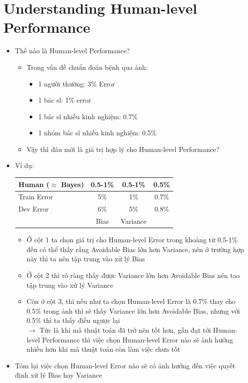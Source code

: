 \documentclass[12pt,a4paper]{report}
\begin{document}
	\section{Understanding Human-level Performance}
		\begin{itemize}
			\item Thế nào là Human-level Performance?
				\begin{itemize}
					\item Trong vấn đề chuẩn đoán bệnh qua ảnh:
						\begin{itemize}
							\item 1 người thường: 3\% Error
							\item 1 bác sĩ: 1\% error
							\item 1 bác sĩ nhiều kinh nghiệm: 0.7\%
							\item 1 nhóm bác sĩ nhiều kinh nghiệm: 0.5\%
						\end{itemize}
					\item Vậy thì đâu mới là giá trị hợp lý cho Human-level Performance?
				\end{itemize}
			\item Ví dụ:\\
				\begin{tabular}{l|c|c|c}
					Human ($\approx$ Bayes)&0.5-1\%&0.5-1\%&0.5\%\\
					\hline
					Train Error&5\%&1\%&0.7\%\\
					Dev Error&6\%&5\%&0.8\%\\
					&Bias&Variance&\\
				\end{tabular}
				\begin{itemize}
					\item Ở cột 1 ta chọn giá trị cho Human-level Error trong khoảng từ 0.5-1\% đều có thể thấy rằng Avoidable Bias lớn hơn Variance, nên ở trường hợp này thì ta nên tập trung vào xử lý Bias
					\item Ở cột 2 thì rõ ràng thấy được Variance lớn hơn Avoidable Bias nên tao tập trung vào xử lý Variance
					\item Còn ở cột 3, thì nếu như ta chọn Human-level Error là 0.7\% thay cho 0.5\% trong ảnh thì sẽ thấy Variance lớn hơn Avoidable Bias, nhưng với 0.5\% thì ta thấy điều ngược lại\\$\rightarrow$ Tức là khi mà thuật toán đã trở nên tốt hơn, gần đạt tới Human-level Performance thì việc chọn Human-level Error nào sẽ ảnh hưởng nhiều hơn khi mà thuật toán còn làm việc chưa tốt
				\end{itemize}
			\item Tóm lại việc chọn Human-level Error nào sẽ có ảnh hưởng đến việc quyết định xử lý Bias hay Variance
		\end{itemize}
\end{document}
